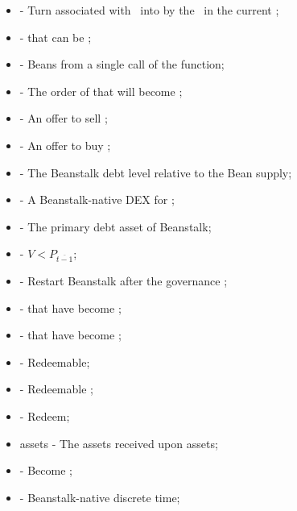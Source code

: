 \documentclass[class=article, crop=false]{standalone}
\begin{document}
\begin{itemize}[topsep=0pt, itemsep=3pt,leftmargin=16pt]
    \item[]  - \hypertarget{ht147}{Turn  associated with  \Bean\ into  by  the  \Bean\ in the current };
    \item[]  - \hypertarget{ht148}{ that can be };
    \item[]  - \hypertarget{ht149}{Beans  from a single call of the  function};
    \item[]  - \hypertarget{ht150}{The order of  that will become };
    \item[]  - \hypertarget{ht151}{An offer to sell };
    \item[]  - \hypertarget{ht152}{An offer to buy };
    \item[]  - \hypertarget{ht153}{The Beanstalk debt level relative to the Bean supply};
    \item[]  - \hypertarget{ht154}{A Beanstalk-native DEX for };
    \item[]  - \hypertarget{ht155}{The primary debt asset of Beanstalk};
    \item[]  - \hypertarget{ht161}{$V < P_{\overline{t-1}}$};
    \item[]  - \hypertarget{ht162}{Restart Beanstalk after the governance };
    \item[]  - \hypertarget{ht163}{ that have become };
    \item[]  - \hypertarget{ht164}{ that have become };
    \item[]  - \hypertarget{ht165}{Redeemable};
    \item[]  - \hypertarget{ht166}{Redeemable };
    \item[]  - \hypertarget{ht167}{Redeem};
    \item[]  assets - \hypertarget{ht168}{The assets received upon   assets};
    \item[]  - \hypertarget{ht169}{Become };
    \item[]  - \hypertarget{ht176}{Beanstalk-native discrete time};

\end{itemize}
\end{document}
